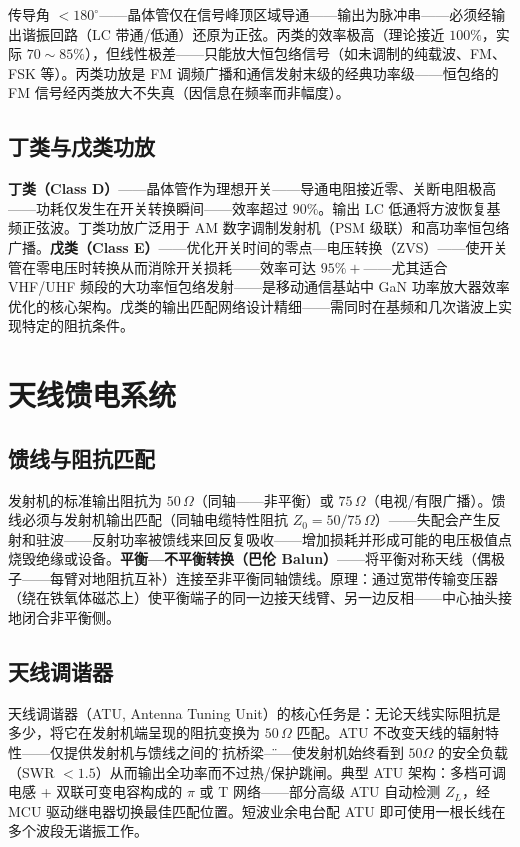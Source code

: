 \documentclass[12pt,UTF8]{ctexbook}
\begin{document}
传导角 $<180^\circ$——晶体管仅在信号峰顶区域导通——输出为脉冲串——必须经输出谐振回路（LC 带通/低通）还原为正弦。丙类的效率极高（理论接近 $100\%$，实际 $70\sim85\%$），但线性极差——只能放大恒包络信号（如未调制的纯载波、FM、FSK 等）。丙类功放是 FM 调频广播和通信发射末级的经典功率级——恒包络的 FM 信号经丙类放大不失真（因信息在频率而非幅度）。

\subsection{丁类与戊类功放}

\textbf{丁类（Class D）}——晶体管作为理想开关——导通电阻接近零、关断电阻极高——功耗仅发生在开关转换瞬间——效率超过 $90\%$。输出 LC 低通将方波恢复基频正弦波。丁类功放广泛用于 AM 数字调制发射机（PSM 级联）和高功率恒包络广播。\textbf{戊类（Class E）}——优化开关时间的零点—电压转换（ZVS）——使开关管在零电压时转换从而消除开关损耗——效率可达 $95\%+$——尤其适合 VHF/UHF 频段的大功率恒包络发射——是移动通信基站中 GaN 功率放大器效率优化的核心架构。戊类的输出匹配网络设计精细——需同时在基频和几次谐波上实现特定的阻抗条件。

\section{天线馈电系统}
\label{sec:antenna_feed}

\subsection{馈线与阻抗匹配}

发射机的标准输出阻抗为 $50\,\Omega$（同轴——非平衡）或 $75\,\Omega$（电视/有限广播）。馈线必须与发射机输出匹配（同轴电缆特性阻抗 $Z_0=50/75\,\Omega$）——失配会产生反射和驻波——反射功率被馈线来回反复吸收——增加损耗并形成可能的电压极值点烧毁绝缘或设备。\textbf{平衡—不平衡转换（巴伦 Balun）}——将平衡对称天线（偶极子——每臂对地阻抗互补）连接至非平衡同轴馈线。原理：通过宽带传输变压器（绕在铁氧体磁芯上）使平衡端子的同一边接天线臂、另一边反相——中心抽头接地闭合非平衡侧。

\subsection{天线调谐器}

天线调谐器（ATU, Antenna Tuning Unit）的核心任务是：无论天线实际阻抗是多少，将它在发射机端呈现的阻抗变换为 $50\,\Omega$ 匹配。ATU 不改变天线的辐射特性——仅提供发射机与馈线之间的\"阻抗桥梁\"——使发射机始终看到 $50\Omega$ 的安全负载（SWR $<1.5$）从而输出全功率而不过热/保护跳闸。典型 ATU 架构：多档可调电感 + 双联可变电容构成的 $\pi$ 或 T 网络——部分高级 ATU 自动检测 $Z_L$，经 MCU 驱动继电器切换最佳匹配位置。短波业余电台配 ATU 即可使用一根长线在多个波段无谐振工作。
\end{document}
